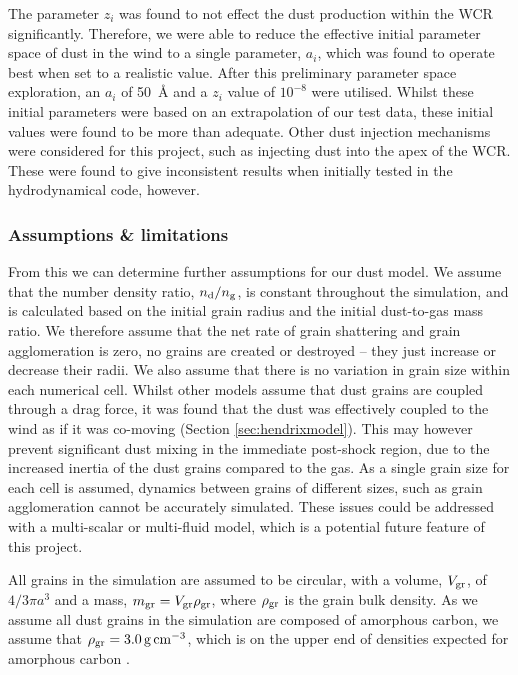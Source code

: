 The parameter $z_i$ was found to not effect the dust production within the WCR significantly.
Therefore, we were able to reduce the effective initial parameter space of dust in the wind to a single parameter, $a_i$, which was found to operate best when set to a realistic value.
After this preliminary parameter space exploration, an $a_i$ of \SI{50}{\angstrom} and a $z_i$ value of $10^{-8}$ were utilised.
Whilst these initial parameters were based on an extrapolation of our test data, these initial values were found to be more than adequate.
Other dust injection mechanisms were considered for this project, such as injecting dust into the apex of the WCR.
These were found to give inconsistent results when initially tested in the \mg{} hydrodynamical code, however.

\subsubsection{Assumptions \& limitations}
\label{sec:bidmasassumptions}
\label{sec:bidmaslimitations}

From this we can determine further assumptions for our dust model.
We assume that the number density ratio, $n_\text{d}/n_\text{g}$, is constant throughout the simulation, and is calculated based on the initial grain radius and the initial dust-to-gas mass ratio.
We therefore assume that the net rate of grain shattering and grain agglomeration is zero, no grains are created or destroyed -- they just increase or decrease their radii.
We also assume that there is no variation in grain size within each numerical cell.
Whilst other models assume that dust grains are coupled through a drag force, it was found that the dust was effectively coupled to the wind as if it was co-moving (Section \ref{sec:hendrixmodel}).
This may however prevent significant dust mixing in the immediate post-shock region, due to the increased inertia of the dust grains compared to the gas.
As a single grain size for each cell is assumed, dynamics between grains of different sizes, such as grain agglomeration cannot be accurately simulated.
These issues could be addressed with a multi-scalar or multi-fluid model, which is a potential future feature of this project.

All grains in the simulation are assumed to be circular, with a volume, $V_\text{gr}$, of $4/3 \pi a^3$ and a mass, $m_\text{gr} = V_\text{gr} \rho_\text{gr}$, where $\rho_\text{gr}$ is the grain bulk density.
As we assume all dust grains in the simulation are composed of amorphous carbon, we assume that $\rho_\text{gr} = \SI{3.0}{g.cm^{-3}}$, which is on the upper end of densities expected for amorphous carbon
\parencite{bhattaraiEvolutionAmorphousCarbon2018}.

